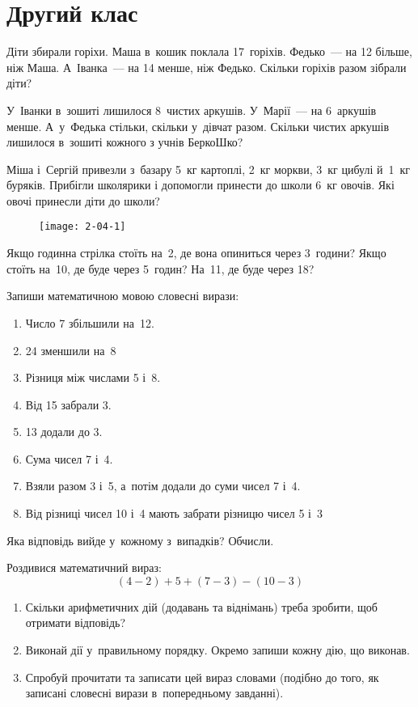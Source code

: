 \chapter{Другий клас}

\problem
Діти збирали горіхи. Маша в~кошик поклала 17~горіхів.
Федько~--- на 12 більше, ніж Маша. А~Іванка~--- на 14 менше, ніж Федько.
Скільки горіхів разом зібрали діти?


\problem
У~Іванки в~зошиті лишилося 8~чистих аркушів.
У~Марії~--- на 6~аркушів менше.
А~у~Федька стільки, скільки у~дівчат разом.
Скільки чистих аркушів лишилося в~зошиті кожного з учнів БеркоШко?


\problem
Міша і~Сергій привезли з~базару 5~кг картоплі, 2~кг моркви,
3~кг цибулі й~1~кг буряків.
Прибігли школярики і допомогли принести до школи 6~кг овочів.
Які овочі принесли діти до школи?


\problem
{}

\begin{figure}[h]
    \centering
    \texttt{[image: 2-04-1]}
\end{figure}

Якщо годинна стрілка стоїть на~2, де вона опиниться через 3~години?
Якщо стоїть на~10, де буде через 5~годин?
На~11, де буде через 18?


\problem
Запиши математичною мовою словесні вирази:
\begin{enumerate}
    \item Число 7 збільшили на~12.
    \item 24 зменшили на~8
    \item Різниця між числами 5 і~8.
    \item Від 15 забрали 3.
    \item 13 додали до 3.
    \item Сума чисел 7 і~4.
    \item Взяли разом 3 і~5, а~потім додали до суми чисел 7 і~4.
    \item Від різниці чисел 10 і~4 мають забрати різницю чисел 5 і~3
\end{enumerate}
Яка відповідь вийде у~кожному з~випадків? Обчисли.


\problem
Роздивися математичний вираз:
\[
(4 - 2) + 5 + (7 - 3) - (10 - 3)
\]
\begin{enumerate}
    \item Скільки арифметичних дій (додавань та віднімань)
    треба зробити, щоб отримати відповідь?
    \item Виконай дії у~правильному порядку.
    Окремо запиши кожну дію, що виконав.
    \item Спробуй прочитати та записати цей вираз словами
    (подібно до того, як записані словесні вирази в~попередньому завданні).
\end{enumerate}



